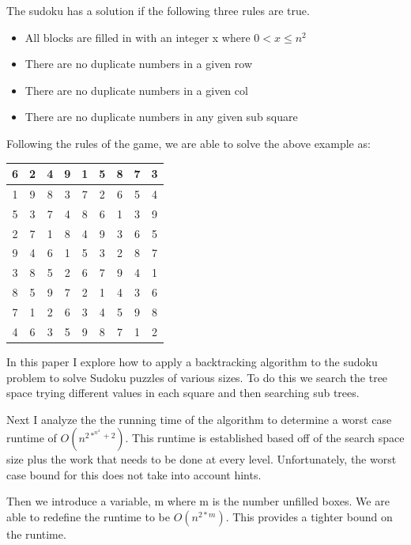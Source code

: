 \documentclass{sig-alternate}
\begin{document}
The sudoku has a solution if the following three rules are true. 

\begin{itemize}
\item{All blocks are filled in with an integer x where $0 < x \le n^2$}
\item{There are no duplicate numbers in a given row}
\item{There are no duplicate numbers in a given col}
\item{There are no duplicate numbers in any given sub square}
\end{itemize}

Following the rules of the game, we are able to solve the above example as: 

\begin{center}
  \begin{tabular}{ | c | c | c | c | c | c | c | c | c |}
    \hline
     6 & 2 & 4 & 9 & 1 & 5 & 8 & 7 & 3 \\ \hline
	 1 & 9 & 8 & 3 & 7 & 2 & 6 & 5 & 4 \\ \hline
	 5 & 3 & 7 & 4 & 8 & 6 & 1 & 3 & 9\\ \hline
	 2 & 7 & 1 & 8 & 4 & 9 & 3 & 6 & 5\\ \hline
	 9 & 4 & 6 & 1 & 5 & 3 & 2 & 8 & 7\\ \hline
	 3 & 8 & 5 & 2 & 6 & 7 & 9 & 4 & 1\\ \hline
     8 & 5 & 9 & 7 & 2 & 1 & 4 & 3 & 6\\ \hline
	 7 & 1 & 2 & 6 & 3 & 4 & 5 & 9 & 8\\ \hline
	 4 & 6 & 3 & 5 & 9 & 8 & 7 & 1 & 2\\ \hline
  \end{tabular}
\end{center}

In this paper I explore how to apply a backtracking algorithm to the sudoku problem to solve Sudoku puzzles of various sizes. To do this we search the tree space trying different values in each square and then searching sub trees. 

Next I analyze the the running time of the algorithm to determine a worst case runtime of $O(n^{2*^{n^4} + 2})$. This runtime is established based off of the search space size plus the work that needs to be done at every level. Unfortunately, the worst case bound for this does not take into account hints. 

Then we introduce a variable, m where m is the number unfilled boxes. We are able to redefine the runtime to be $O(n^{2*m})$. This provides a tighter bound on the runtime. 
\end{document}

